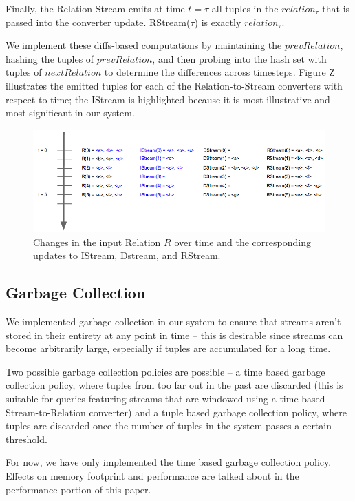 \documentclass[a4paper, 10pt, conference]{IEEEconf}
\begin{document}
Finally, the Relation Stream emits at time $t = \tau$ all tuples in the $relation_{\tau}$ that is passed into the converter update. RStream($\tau$) is exactly $relation_{\tau}$.

We implement these diffs-based computations by maintaining the $prevRelation$, hashing the tuples of $prevRelation$, and then probing into the hash set with tuples of $nextRelation$ to determine the differences across timesteps. Figure Z illustrates the emitted tuples for each of the Relation-to-Stream converters with respect to time; the IStream is highlighted because it is most illustrative and most significant in our system. 

\begin{figure}[tpH]
    \centering
    \centerline{\includegraphics[totalheight=3cm]{stream_converter.png}}
    \caption{Changes in the input Relation $R$ over time and the corresponding updates to IStream, Dstream, and RStream.}
    \label{fig:stream_converter}
\end{figure}


\subsection{Garbage Collection}
We implemented garbage collection in our system to ensure that streams aren’t stored in their entirety at any point in time -- this is desirable since streams can become arbitrarily large, especially if tuples are accumulated for a long time.

Two possible garbage collection policies are possible -- a time based garbage collection policy, where tuples from too far out in the past are discarded (this is suitable for queries featuring streams that are windowed using a time-based Stream-to-Relation converter) and a tuple based garbage collection policy, where tuples are discarded once the number of tuples in the system passes a certain threshold.

For now, we have only implemented the time based garbage collection policy. Effects on memory footprint and performance are talked about in the performance portion of this paper.
\end{document}
